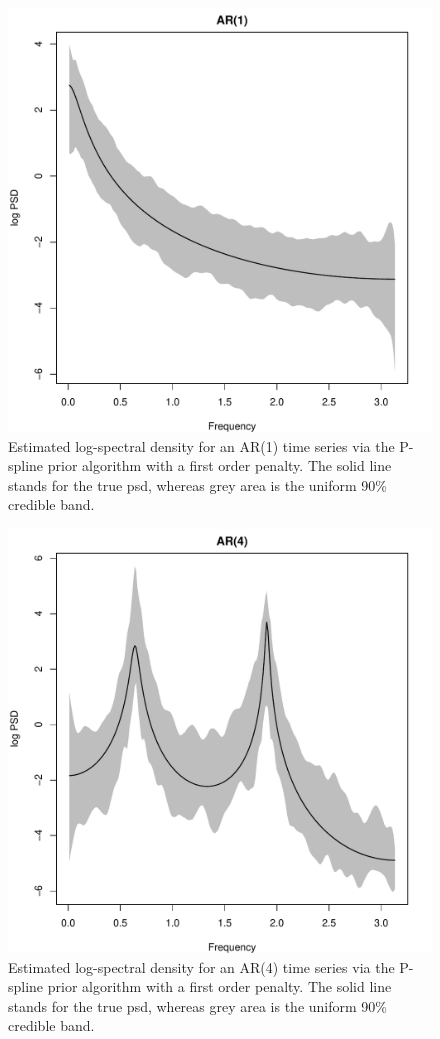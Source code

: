 \documentclass[twocolumn,final]{svjour3}
\begin{document}
\begin{figure}[]
	\centering
	\includegraphics[scale=0.4,clip=true,angle=0]{ar1.pdf}
	\caption{Estimated log-spectral density for an AR(1) time series via the P-spline prior algorithm with a first order penalty.  The solid line stands for the true psd, whereas grey area is the uniform 90\% credible band.}
	\label{fig:ar1}
\end{figure}

\begin{figure}[]
	\centering
	\includegraphics[scale=0.4,clip=true,angle=0]{ar4.pdf}
	\caption{Estimated log-spectral density for an AR(4) time series via the P-spline prior algorithm with a first order penalty.  The solid line stands for the true psd, whereas grey area is the uniform 90\% credible band.}
	\label{fig:ar4}
\end{figure}
\end{document}
